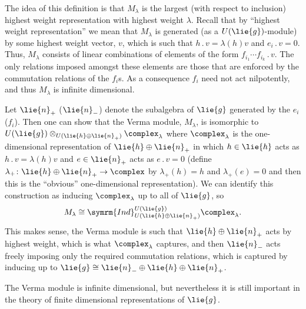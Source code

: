\documentclass[fleqn]{NotesClass}
\newcommand{\action}{\mathbin{.}}
\newcommand{\isomorphic}{\cong}
\newcommand{\Ind}{\symrm{Ind}}
\begin{document}
    The idea of this definition is that \(M_\lambda\) is the largest (with respect to inclusion) highest weight representation with highest weight \(\lambda\).
    Recall that by \enquote{highest weight representation} we mean that \(M_\lambda\) is generated (as a \(U(\lie{g})\)-module) by some highest weight vector, \(v\), which is such that \(h \action v = \lambda(h) v\) and \(e_i \action v = 0\).
    Thus, \(M_\lambda\) consists of linear combinations of elements of the form \(f_{i_1} \dotsm f_{i_k} \action v\).
    The only relations imposed amongst these elements are those that are enforced by the commutation relations of the \(f_i\)s.
    As a consequence \(f_i\) need not act nilpotently, and thus \(M_\lambda\) is infinite dimensional.
    
    Let \(\lie{n}_+\) (\(\lie{n}_-\)) denote the subalgebra of \(\lie{g}\) generated by the \(e_i\) (\(f_i\)).
    Then one can show that the Verma module, \(M_\lambda\), is isomorphic to \(U(\lie{g}) \otimes_{U(\lie{h} \oplus \lie{n}_+)} \complex_\lambda\) where \(\complex_\lambda\) is the one-dimensional representation of \(\lie{h} \oplus \lie{n}_+\) in which \(h \in \lie{h}\) acts as \(h \action v = \lambda(h)v\) and \(e \in \lie{n}_+\) acts as \(e \action v = 0\) (define \(\lambda_+ \colon \lie{h} \oplus \lie{n}_+ \to \complex\) by \(\lambda_+(h) = h\) and \(\lambda_+(e) = 0\) and then this is the \enquote{obvious} one-dimensional representation).
    We can identify this construction as inducing \(\complex_\lambda\) up to all of \(\lie{g}\), so
    \begin{equation}
        M_\lambda \isomorphic \Ind^{U(\lie{g})}_{U(\lie{h} \oplus \lie{n}_+)} \complex_\lambda.
    \end{equation}
    This makes sense, the Verma module is such that \(\lie{h} \oplus \lie{n}_+\) acts by highest weight, which is what \(\complex_\lambda\) captures, and then \(\lie{n}_-\) acts freely imposing only the required commutation relations, which is captured by inducing up to \(\lie{g} \isomorphic \lie{n}_- \oplus \lie{h} \oplus \lie{n}_+\).
    
    The Verma module is infinite dimensional, but nevertheless it is still important in the theory of finite dimensional representations of \(\lie{g}\).
    
\end{document}
